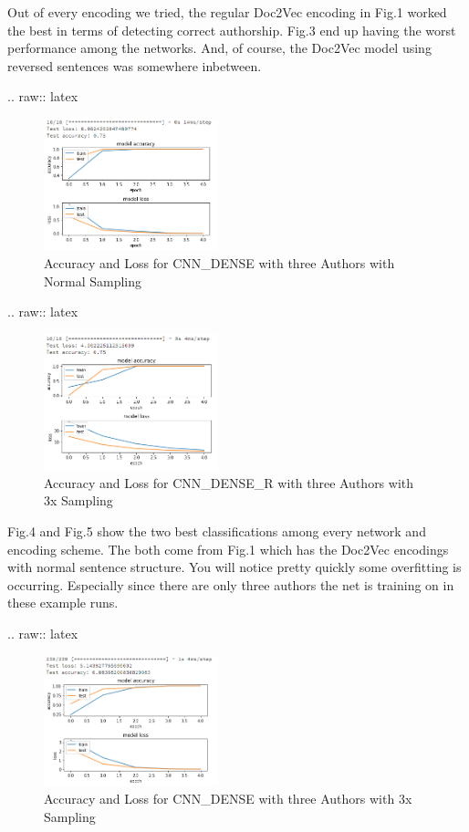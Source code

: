\documentclass[conference]{IEEEtran}
\begin{document}
Out of every encoding we tried, the regular Doc2Vec encoding in Fig.1
worked the best in terms of detecting correct authorship. Fig.3 end up
having the worst performance among the networks. And, of course, the
Doc2Vec model using reversed sentences was somewhere inbetween.

.. raw:: latex

   \begin{figure}[h!]
     \centering
       \includegraphics[width=0.45\textwidth]{CNN_DENSE_OVERSAMPLING_RESULTS_3_AUTHORS}
     \caption{Accuracy and Loss for CNN\_DENSE with three Authors with Normal Sampling}
   \end{figure}

.. raw:: latex

   \begin{figure}[h!]
     \centering
       \includegraphics[width=0.45\textwidth]{CNN_DENSE_3_REGULARIZERS_OVERSAMPLING_RESULTS}
     \caption{Accuracy and Loss for CNN\_DENSE\_R with three Authors with 3x Sampling}
   \end{figure}

Fig.4 and Fig.5 show the two best classifications among every network
and encoding scheme. The both come from Fig.1 which has the Doc2Vec
encodings with normal sentence structure. You will notice pretty quickly
some overfitting is occurring. Especially since there are only three
authors the net is training on in these example runs.

.. raw:: latex

   \begin{figure}[h!]
     \centering
       \includegraphics[width=0.45\textwidth]{CNN_DENSE_OVERSAMPLING_RESULTS_35_AUTHORS}
     \caption{Accuracy and Loss for CNN\_DENSE with three Authors with 3x Sampling}
   \end{figure}
\end{document}
